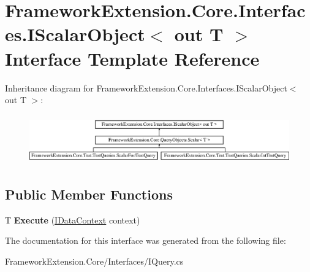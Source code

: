 \hypertarget{interface_framework_extension_1_1_core_1_1_interfaces_1_1_i_scalar_object-g}{\section{Framework\-Extension.\-Core.\-Interfaces.\-I\-Scalar\-Object$<$ out T $>$ Interface Template Reference}
\label{interface_framework_extension_1_1_core_1_1_interfaces_1_1_i_scalar_object-g}
}
Inheritance diagram for Framework\-Extension.\-Core.\-Interfaces.\-I\-Scalar\-Object$<$ out T $>$\-:\begin{figure}[H]
\begin{center}
\leavevmode
\includegraphics[height=2.153846cm]{interface_framework_extension_1_1_core_1_1_interfaces_1_1_i_scalar_object-g}
\end{center}
\end{figure}
\subsection*{Public Member Functions}
\begin{DoxyCompactItemize}
\item 
\hypertarget{interface_framework_extension_1_1_core_1_1_interfaces_1_1_i_scalar_object-g_a1ea51f0b87546fa95ae792a6c23663e5}{T {\bfseries Execute} (\hyperlink{interface_framework_extension_1_1_core_1_1_interfaces_1_1_i_data_context}{I\-Data\-Context} context)}\label{interface_framework_extension_1_1_core_1_1_interfaces_1_1_i_scalar_object-g_a1ea51f0b87546fa95ae792a6c23663e5}

\end{DoxyCompactItemize}


The documentation for this interface was generated from the following file\-:\begin{DoxyCompactItemize}
\item 
Framework\-Extension.\-Core/\-Interfaces/I\-Query.\-cs\end{DoxyCompactItemize}
